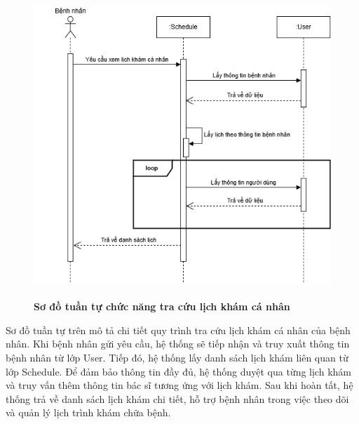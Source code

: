 \begin{figure}[H]
	\centering
	\includegraphics[width=12.5cm,height=11.5cm]{Images/sequence/schedule/getByPatient.drawio.png}
	\caption[Sơ đồ tuần tự chức năng tra cứu lịch khám cá nhân]{\bfseries \fontsize{12pt}{0pt}
		\selectfont Sơ đồ tuần tự chức năng tra cứu lịch khám cá nhân}
	\label{sequence_get_by_patient} %
\end{figure}
Sơ đồ tuần tự trên mô tả chi tiết quy trình tra cứu lịch khám cá nhân của bệnh nhân. Khi bệnh nhân gửi yêu cầu, hệ thống sẽ tiếp nhận và truy xuất thông tin bệnh nhân từ lớp User.
Tiếp đó, hệ thống lấy danh sách lịch khám liên quan từ lớp Schedule. Để đảm bảo thông tin đầy đủ, hệ thống duyệt qua từng lịch khám và truy vấn thêm thông tin bác sĩ tương ứng với lịch khám.
Sau khi hoàn tất, hệ thống trả về danh sách lịch khám chi tiết, hỗ trợ bệnh nhân trong việc theo dõi và quản lý lịch trình khám chữa bệnh.


